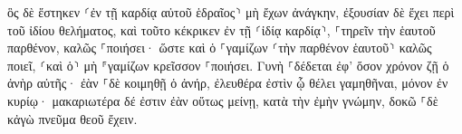 \documentclass{openreader}
\begin{document}
ὃς δὲ ἕστηκεν ⸂ἐν τῇ καρδίᾳ αὐτοῦ ἑδραῖος⸃ μὴ ἔχων ἀνάγκην, ἐξουσίαν δὲ ἔχει περὶ τοῦ ἰδίου θελήματος, καὶ τοῦτο κέκρικεν ἐν τῇ ⸂ἰδίᾳ καρδίᾳ⸃, ⸀τηρεῖν τὴν ἑαυτοῦ παρθένον, καλῶς ⸀ποιήσει· 
ὥστε καὶ ὁ ⸀γαμίζων ⸂τὴν παρθένον ἑαυτοῦ⸃ καλῶς ποιεῖ, ⸂καὶ ὁ⸃ μὴ ⸁γαμίζων κρεῖσσον ⸀ποιήσει. 
Γυνὴ ⸀δέδεται ἐφ’ ὅσον χρόνον ζῇ ὁ ἀνὴρ αὐτῆς· ἐὰν ⸀δὲ κοιμηθῇ ὁ ἀνήρ, ἐλευθέρα ἐστὶν ᾧ θέλει γαμηθῆναι, μόνον ἐν κυρίῳ· 
μακαριωτέρα δέ ἐστιν ἐὰν οὕτως μείνῃ, κατὰ τὴν ἐμὴν γνώμην, δοκῶ ⸀δὲ κἀγὼ πνεῦμα θεοῦ ἔχειν. 
\end{document}
